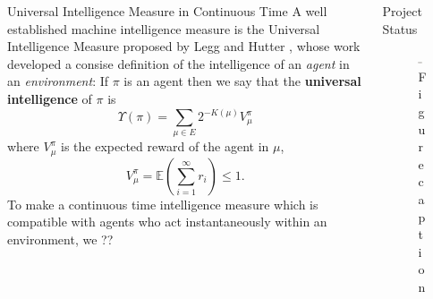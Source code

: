 \documentclass[final]{beamer}
\newlength{\onecolwid}
\newlength{\twocolwid}
\begin{document}
\begin{frame}[t]
\begin{columns}[t]
\begin{column}{\twocolwid}
\begin{columns}[t,totalwidth=\twocolwid]
\begin{column}{\onecolwid}
\begin{block}{Universal Intelligence Measure in Continuous Time}
A well established\cite{}  machine intelligence measure is the Universal Intelligence Measure proposed by Legg and Hutter \cite{}, whose work developed a consise definition of the intelligence of an \emph{agent} in an \emph{environment}:
	If $\pi$ is an agent then we say that the \textbf{universal intelligence} of $\pi$ is
	\begin{equation} 
		\Upsilon(\pi) = \sum_{\mu \in E}2^{-K(\mu)}V_\mu^\pi
	\end{equation}
	where $V_\mu^\pi$ is the expected reward of the agent in $\mu$,
	\begin{equation}
		V_\mu^\pi = \mathbb{E}\left(\sum_{i=1}^\infty r_i\right) \leq 1.
	\end{equation}
To make a continuous time intelligence measure which is compatible with agents who act instantaneously within an environment, we ??

\end{block}


\end{column} %

\begin{column}{\onecolwid} %


\begin{block}{Project Status}

\begin{figure}
\includegraphics[width=0.8\linewidth]{placeholder.jpg}
\caption{Figure caption}
\end{figure}


\end{block}
\end{column}
\end{columns}
\end{column}
\end{columns}
\end{frame}
\end{document}
